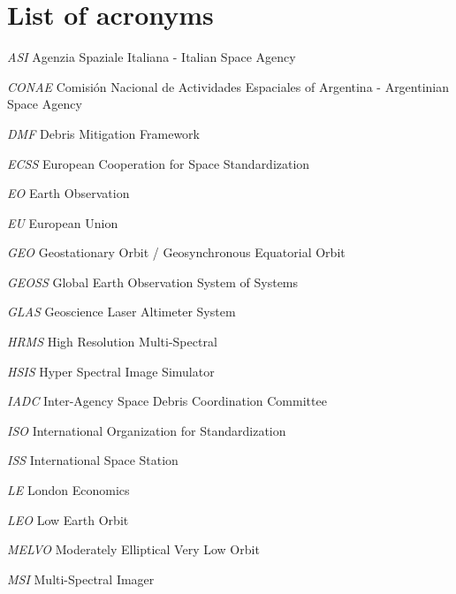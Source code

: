 \documentclass[12pt,a4paper,notitlepage,twoside,openright]{report}
\begin{document}







\newpage



\chapter*{List of acronyms}
\begin{abbrv}
\item[\textit{ASI}] Agenzia Spaziale Italiana - Italian Space Agency
\item[\textit{CONAE}] Comisión Nacional de Actividades Espaciales of Argentina - \newline Argentinian Space Agency
\item[\textit{DMF}] Debris Mitigation Framework
\item[\textit{ECSS}] European Cooperation for Space Standardization
\item[\textit{EO}] Earth Observation
\item[\textit{EU}] European Union
\item[\textit{GEO}] Geostationary Orbit / Geosynchronous Equatorial Orbit
\item[\textit{GEOSS}] Global Earth Observation System of Systems
\item[\textit{GLAS}] Geoscience Laser Altimeter System
\item[\textit{HRMS}] High Resolution Multi-Spectral
\item[\textit{HSIS}] Hyper Spectral Image Simulator
\item[\textit{IADC}] Inter-Agency Space Debris Coordination Committee
\item[\textit{ISO}] International Organization for Standardization
\item[\textit{ISS}] International Space Station
\item[\textit{LE}] London Economics
\item[\textit{LEO}] Low Earth Orbit
\item[\textit{MELVO}] Moderately Elliptical Very Low Orbit
\item[\textit{MSI}] Multi-Spectral Imager

\end{abbrv}
\end{document}
